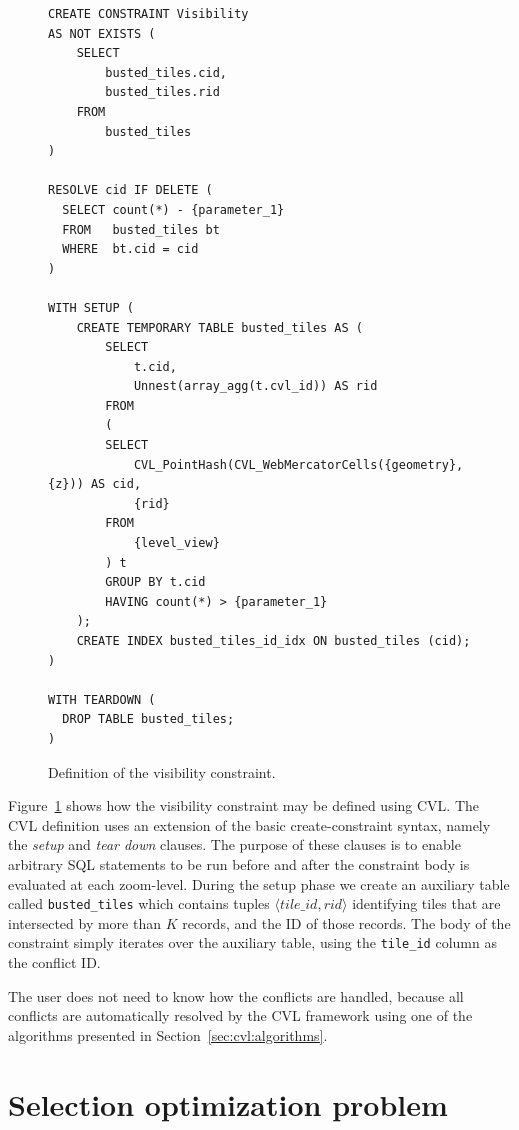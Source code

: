\documentclass[11pt, oneside]{report}
\begin{document}
{\begin{figure}[htbp]
\begin{center}
\begin{lstlisting}
CREATE CONSTRAINT Visibility
AS NOT EXISTS (
    SELECT
        busted_tiles.cid,
        busted_tiles.rid
    FROM
        busted_tiles
)

RESOLVE cid IF DELETE (
  SELECT count(*) - {parameter_1}
  FROM   busted_tiles bt
  WHERE  bt.cid = cid
)

WITH SETUP (
    CREATE TEMPORARY TABLE busted_tiles AS (
        SELECT
            t.cid,
            Unnest(array_agg(t.cvl_id)) AS rid
        FROM
        (
        SELECT
            CVL_PointHash(CVL_WebMercatorCells({geometry}, {z})) AS cid,
            {rid}
        FROM
            {level_view}
        ) t
        GROUP BY t.cid
        HAVING count(*) > {parameter_1}
    );
    CREATE INDEX busted_tiles_id_idx ON busted_tiles (cid);
)

WITH TEARDOWN (
  DROP TABLE busted_tiles;
)
\end{lstlisting}
\caption{Definition of the visibility constraint.}
\label{fig:visibility:definition}
\end{center}
\end{figure}



Figure~\ref{fig:visibility:definition} shows how the visibility constraint may be defined using CVL. The CVL definition uses an extension of the basic create-constraint syntax, namely the \emph{setup} and \emph{tear down} clauses. 
The purpose of these clauses is to enable arbitrary SQL statements to be run before and after the constraint body is evaluated at each zoom-level. During the setup phase we create an auxiliary table called \texttt{busted\_tiles} which contains tuples $\langle tile\_id, rid \rangle$ identifying tiles that are intersected by more than $K$ records, and the ID of those records. The body of the constraint simply iterates over the auxiliary table, using the \texttt{tile\_id} column as the conflict ID.

The user does not need to know how the conflicts are handled, because all conflicts are automatically resolved by the CVL framework using one of the algorithms presented in Section~\ref{sec:cvl:algorithms}.

\section{Selection optimization problem}
\label{sec:optimizationmodel}

}
\end{document}
